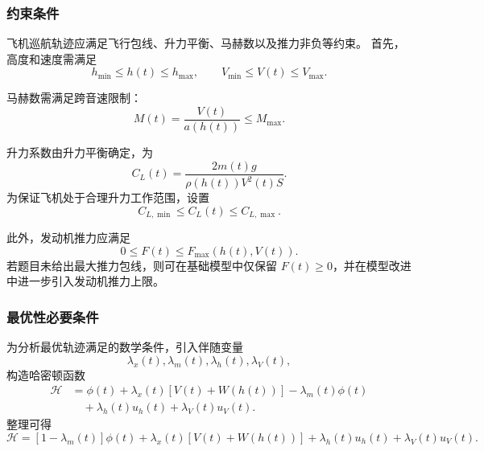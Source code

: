 \documentclass[UTF8]{ctexart}
\begin{document}
\subsubsection{约束条件}

飞机巡航轨迹应满足飞行包线、升力平衡、马赫数以及推力非负等约束。
首先，高度和速度需满足
\begin{equation}
    h_{\min}\leq h(t)\leq h_{\max},
    \qquad
    V_{\min}\leq V(t)\leq V_{\max}.
    \label{eq:q3_hV_bounds}
\end{equation}

马赫数需满足跨音速限制：
\begin{equation}
    M(t)=\frac{V(t)}{a(h(t))}\leq M_{\max}.
    \label{eq:q3_mach_constraint}
\end{equation}

升力系数由升力平衡确定，为
\begin{equation}
    C_L(t)=\frac{2m(t)g}{\rho(h(t))V^2(t)S}.
    \label{eq:q3_CL}
\end{equation}
为保证飞机处于合理升力工作范围，设置
\begin{equation}
    C_{L,\min}\leq C_L(t)\leq C_{L,\max}.
    \label{eq:q3_CL_bounds}
\end{equation}

此外，发动机推力应满足
\begin{equation}
    0\leq F(t)\leq F_{\max}(h(t),V(t)).
    \label{eq:q3_thrust_constraint}
\end{equation}
若题目未给出最大推力包线，则可在基础模型中仅保留 $F(t)\geq0$，并在模型改进中进一步引入发动机推力上限。

\subsubsection{最优性必要条件}

为分析最优轨迹满足的数学条件，引入伴随变量
\[
\lambda_x(t),\lambda_m(t),\lambda_h(t),\lambda_V(t),
\]
构造哈密顿函数
\begin{equation}
\begin{aligned}
    \mathcal H
    &=
    \phi(t)
    +\lambda_x(t)\left[V(t)+W(h(t))\right]
    -\lambda_m(t)\phi(t) \\
    &\quad
    +\lambda_h(t)u_h(t)
    +\lambda_V(t)u_V(t).
\end{aligned}
\label{eq:q3_Hamiltonian}
\end{equation}
整理可得
\begin{equation}
    \mathcal H
    =
    \left[1-\lambda_m(t)\right]\phi(t)
    +\lambda_x(t)\left[V(t)+W(h(t))\right]
    +\lambda_h(t)u_h(t)
    +\lambda_V(t)u_V(t).
    \label{eq:q3_Hamiltonian_simple}
\end{equation}
\end{document}
